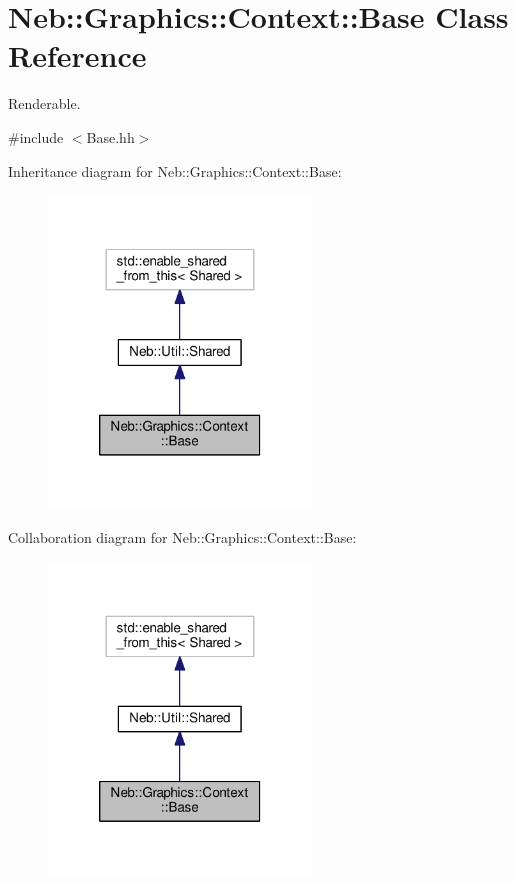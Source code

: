 \hypertarget{classNeb_1_1Graphics_1_1Context_1_1Base}{\section{Neb\-:\-:Graphics\-:\-:Context\-:\-:Base Class Reference}
\label{classNeb_1_1Graphics_1_1Context_1_1Base}
}


Renderable.  




{\ttfamily \#include $<$Base.\-hh$>$}



Inheritance diagram for Neb\-:\-:Graphics\-:\-:Context\-:\-:Base\-:
\nopagebreak
\begin{figure}[H]
\begin{center}
\leavevmode
\includegraphics[width=198pt]{classNeb_1_1Graphics_1_1Context_1_1Base__inherit__graph}
\end{center}
\end{figure}


Collaboration diagram for Neb\-:\-:Graphics\-:\-:Context\-:\-:Base\-:
\nopagebreak
\begin{figure}[H]
\begin{center}
\leavevmode
\includegraphics[width=198pt]{classNeb_1_1Graphics_1_1Context_1_1Base__coll__graph}
\end{center}
\end{figure}
